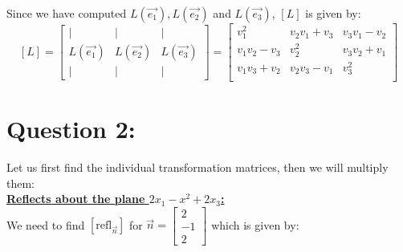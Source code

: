 \documentclass{article}
\begin{document}
Since we have computed $L(\vec{e_1}),L(\vec{e_2})$ and $L(\vec{e_3})$, $[L]$ is given by:$$[L]=\begin{bmatrix}
    | & | & | \\
    L(\vec{e_1}) & L(\vec{e_2}) & L(\vec{e_3})\\
    | & | & |
\end{bmatrix}=\begin{bmatrix}
    v_1^2 &  v_2v_1+v_3 & v_3v_1-v_2\\
    v_1v_2-v_3 & v_2^2& v_3v_2+v_1\\
    v_1v_3+v_2 &v_2v_3-v_1 &v_3^2 \\
\end{bmatrix}$$
\newpage
\section*{Question 2:}
Let us first find the individual transformation matrices, then we will multiply them:\\
\textbf{\underline{Reflects about the plane $2x_1-x^2+2x_3$:}}\\
We need to find $[\text{refl}_{\vec{n}}]$ for $\vec{n}=\begin{bmatrix}2\\-1\\2\end{bmatrix}$ which is given by: 
\end{document}
